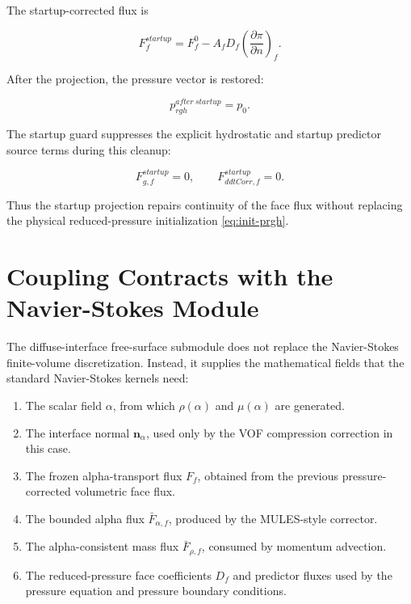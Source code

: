 \documentclass[11pt]{article}
\begin{document}
The startup-corrected flux is

\begin{equation}
  F_f^{startup}
  =
  F_f^0
  -
  A_fD_f
  \left(\frac{\partial\pi}{\partial n}\right)_f.
\end{equation}

After the projection, the pressure vector is restored:

\begin{equation}
  p_{rgh}^{after\ startup}=p_0.
\end{equation}

The startup guard suppresses the explicit hydrostatic and startup predictor
source terms during this cleanup:

\begin{equation}
  F_{g,f}^{startup}=0,
  \qquad
  F_{ddtCorr,f}^{startup}=0.
\end{equation}

Thus the startup projection repairs continuity of the face flux without
replacing the physical reduced-pressure initialization \eqref{eq:init-prgh}.

\section{Coupling Contracts with the Navier-Stokes Module}

The diffuse-interface free-surface submodule does not replace the Navier-Stokes
finite-volume discretization.  Instead, it supplies the mathematical fields
that the standard Navier-Stokes kernels need:

\begin{enumerate}[leftmargin=2.5em]
  \item The scalar field \(\alpha\), from which \(\rho(\alpha)\) and
        \(\mu(\alpha)\) are generated.
  \item The interface normal \(\mathbf{n}_{\alpha}\), used only by the VOF
        compression correction in this case.
  \item The frozen alpha-transport flux \(F_f\), obtained from the previous
        pressure-corrected volumetric face flux.
  \item The bounded alpha flux \(\bar{F}_{\alpha,f}\), produced by the MULES-style
        corrector.
  \item The alpha-consistent mass flux \(\bar{F}_{\rho,f}\), consumed by
        momentum advection.
  \item The reduced-pressure face coefficients \(D_f\) and predictor fluxes
        used by the pressure equation and pressure boundary conditions.
\end{enumerate}
\end{document}
